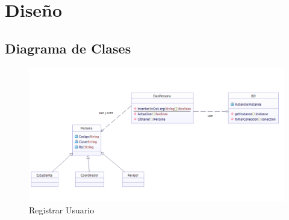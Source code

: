\chapter{Diseño}





\section{Diagrama de Clases}

\begin{figure}[th!]
	\centering
	\includegraphics[width=1.2\linewidth]{uml/Clases/ClasesCrearUsuario}
	\caption{Registrar Usuario}
	\label{fig:Registrar Usuario}
\end{figure}

\newpage

